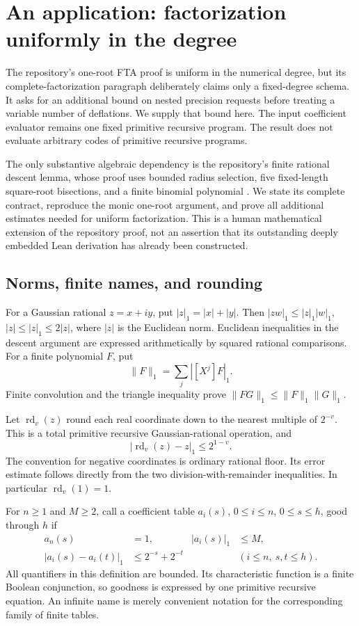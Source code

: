 \section{An application: factorization uniformly in the degree}
\label{sec:fta-extension}

The repository's one-root FTA proof is uniform in the numerical degree,
but its complete-factorization paragraph deliberately claims only a
fixed-degree schema.  It asks for an additional bound on nested precision
requests before treating a variable number of deflations.  We supply that
bound here.  The input coefficient evaluator remains one fixed primitive
recursive program.  The result does not evaluate arbitrary codes of
primitive recursive programs.

The only substantive algebraic dependency is the repository's finite
rational descent lemma, whose proof uses bounded radius selection, five
fixed-length square-root bisections, and a finite binomial polynomial
\cite{repo-fta}.  We state its complete contract, reproduce the monic
one-root argument, and prove all additional estimates needed for uniform
factorization.  This is a human mathematical extension of the repository
proof, not an assertion that its outstanding deeply embedded Lean
derivation has already been constructed.

\subsection{Norms, finite names, and rounding}

For a Gaussian rational $z=x+iy$, put $|z|_1=|x|+|y|$.
Then $|zw|_1\le |z|_1|w|_1$, $|z|\le |z|_1\le 2|z|$, where
$|z|$ is the Euclidean norm.  Euclidean inequalities in the descent
argument are expressed arithmetically by squared rational comparisons.
For a finite polynomial $F$, put
\[
 \|F\|_1=\sum_j |[X^j]F|_1.
\]
Finite convolution and the triangle inequality prove
$\|FG\|_1\le\|F\|_1\|G\|_1$.

Let $\operatorname{rd}_v(z)$ round each real coordinate down to the
nearest multiple of $2^{-v}$.  This is a total primitive recursive
Gaussian-rational operation, and
\[
 |\operatorname{rd}_v(z)-z|_1\le 2^{1-v}.
 \tag{F1}\label{eq:fta-round}
\]
The convention for negative coordinates is ordinary rational floor.
Its error estimate follows directly from the two division-with-remainder
inequalities.  In particular $\operatorname{rd}_v(1)=1$.

For $n\ge1$ and $M\ge2$, call a coefficient table
$a_i(s)$, $0\le i\le n$, $0\le s\le h$, good through $h$ if
\begin{align*}
 a_n(s)&=1, & |a_i(s)|_1&\le M,\\
 |a_i(s)-a_i(t)|_1&\le 2^{-s}+2^{-t}
 &&(i\le n,\ s,t\le h).
\end{align*}
All quantifiers in this definition are bounded.  Its characteristic
function is a finite Boolean conjunction, so goodness is expressed by
one primitive recursive equation.  An infinite name is merely convenient
notation for the corresponding family of finite tables.

